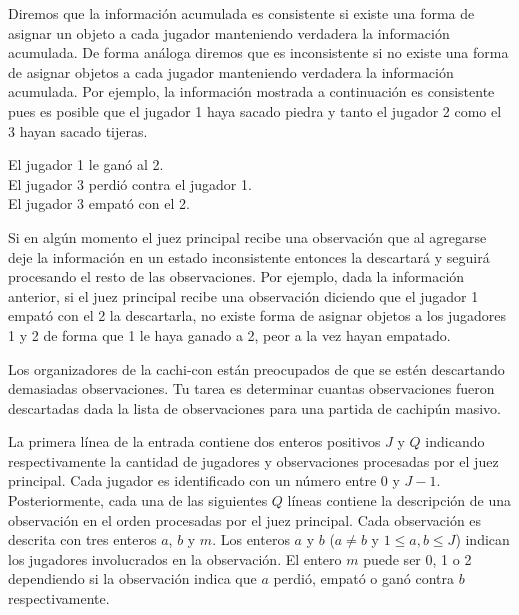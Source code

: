 \documentclass{oci}
\begin{document}
\begin{problemDescription}
  Diremos que la información acumulada es consistente si existe una forma de
  asignar un objeto a cada jugador manteniendo verdadera la información
  acumulada.
  De forma análoga diremos que es inconsistente si no existe una forma de
  asignar objetos a cada jugador manteniendo verdadera la información acumulada.
  Por ejemplo, la información mostrada a continuación es consistente pues es
  posible que el jugador 1 haya sacado piedra y tanto el jugador 2 como
  el 3 hayan sacado tijeras.

    \begin{center}
      El jugador 1 le ganó al 2.\\
      El jugador 3 perdió contra el jugador 1.\\
      El jugador 3 empató con el 2.
    \end{center}

  Si en algún momento el juez principal recibe una observación que al agregarse
  deje la información en un estado inconsistente entonces la descartará y
  seguirá procesando el resto de las observaciones.
  Por ejemplo, dada la información anterior, si el juez principal recibe una
  observación diciendo que el jugador 1 empató con el 2 la descartarla, no
  existe forma de asignar objetos a los jugadores 1 y 2 de forma que 1 le haya
  ganado a 2, peor a la vez hayan empatado.

  Los organizadores de la cachi-con están preocupados de que se estén
  descartando demasiadas observaciones.
  Tu tarea es determinar cuantas observaciones fueron descartadas dada la lista
  de observaciones para una partida de cachipún masivo.
\end{problemDescription}

\begin{inputDescription}
  La primera línea de la entrada contiene dos enteros positivos $J$ y $Q$
  indicando respectivamente la cantidad de jugadores y observaciones procesadas
  por el juez principal.
  Cada jugador es identificado con un número entre 0 y $J-1$.
  Posteriormente, cada una de las siguientes $Q$ líneas contiene la descripción
  de una observación en el orden procesadas por el juez principal.
  Cada observación es descrita con tres enteros $a$, $b$ y $m$.
  Los enteros $a$ y $b$ ($a\neq b$ y $1\leq a, b \leq J$) indican los jugadores
  involucrados en la observación. 
  El entero $m$ puede ser 0, 1 o 2 dependiendo si la observación indica que $a$
  perdió, empató o ganó contra $b$ respectivamente.
\end{inputDescription}
\end{document}
